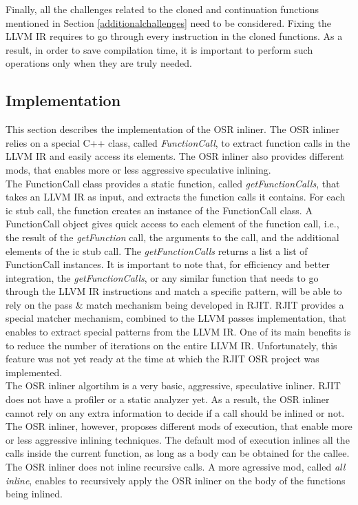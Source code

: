 Finally, all the challenges related to the cloned and continuation functions mentioned in Section \ref{additionalchallenges} need to be considered.
Fixing the LLVM IR requires to go through every instruction in the cloned functions.
As a result, in order to save compilation time, it is important to perform such operations only when they are truly needed.\\

\subsection{Implementation}
This section describes the implementation of the OSR inliner.
The OSR inliner relies on a special C++ class, called \textit{FunctionCall}, to extract function calls in the LLVM IR and easily access its elements. 
The OSR inliner also provides different mods, that enables more or less aggressive speculative inlining.\\

The FunctionCall class provides a static function, called \textit{getFunctionCalls}, that takes an LLVM IR as input, and extracts the function calls it contains.
For each ic stub call, the function creates an instance of the FunctionCall class. 
A FunctionCall object gives quick access to each element of the function call, i.e., the result of the \textit{getFunction} call, the arguments to the call, and the additional elements of the ic stub call.
The \textit{getFunctionCalls} returns a list a list of FunctionCall instances.
It is important to note that, for efficiency and better integration, the \textit{getFunctionCalls}, or any similar function that needs to go through the LLVM IR instructions and match a specific pattern, will be able to rely on the pass \& match mechanism being developed in RJIT.
RJIT provides a special matcher mechanism, combined to the LLVM passes implementation, that enables to extract special patterns from the LLVM IR.
One of its main benefits is to reduce the number of iterations on the entire LLVM IR.
Unfortunately, this feature was not yet ready at the time at which the RJIT OSR project was implemented.\\

The OSR inliner algortihm is a very basic, aggressive, speculative inliner. 
RJIT does not have a profiler or a static analyzer yet.
As a result, the OSR inliner cannot rely on any extra information to decide if a call should be inlined or not.
The OSR inliner, however, proposes different mods of execution, that enable more or less aggressive inlining techniques.
The default mod of execution inlines all the calls inside the current function, as long as a body can be obtained for the callee.
The OSR inliner does not inline recursive calls.
A more agressive mod, called \textit{all inline}, enables to recursively apply the OSR inliner on the body of the functions being inlined.
\\

